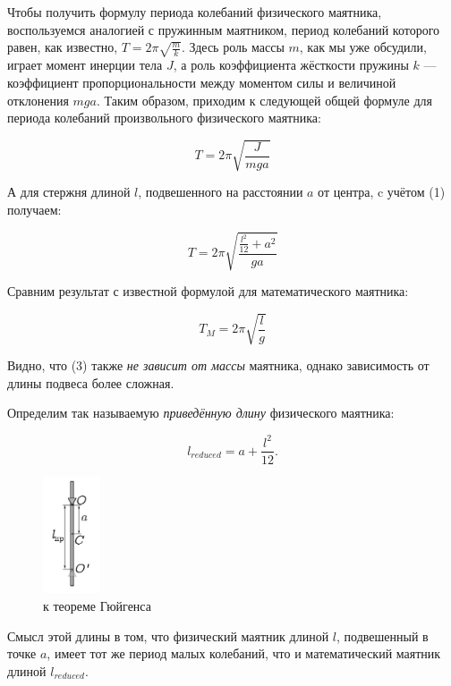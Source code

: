\documentclass[12pt, a4paper]{article}
\begin{document}
Чтобы получить формулу периода колебаний физического маятника,
воспользуемся аналогией с пружинным маятником, период колебаний которого
равен, как известно, $T = 2\pi\sqrt{\frac{m}{k}}$. Здесь роль массы $m$,
как мы уже обсудили, играет момент инерции тела $J$, а роль коэффициента
жёсткости пружины $k$ — коэффициент пропорциональности между моментом силы и
величиной отклонения $mga$. Таким образом, приходим к следующей общей формуле
для периода колебаний произвольного физического маятника:

\begin{equation}
    T = 2\pi\sqrt{\frac{J}{mga}}
\end{equation}

А для стержня длиной $l$, подвешенного на расстоянии $a$ от центра, c учётом
(1) получаем:

\begin{equation}
    T = 2\pi\sqrt{\frac{\frac{l^2}{12} + a^2}{ga}}
\end{equation}

Сравним результат с известной формулой для математического маятника:

\begin{equation}
    T_M = 2\pi\sqrt{\frac{l}{g}}
\end{equation}

Видно, что (3) также \textit{не зависит от массы} маятника, однако зависимость
от длины подвеса более сложная. 

Определим так называемую \textit{приведённую длину} физического маятника:

\begin{equation}
    l_{reduced} = a + \frac{l^2}{12}.
\end{equation}

\newpage

\begin{figure}
    \centering
    \includegraphics[width = 0.15\textwidth]{Figure 2}
    \caption{к теореме Гюйгенса}
\end{figure}

Смысл этой длины в том, что физический маятник длиной $l$, подвешенный
в точке $a$, имеет тот же период малых колебаний, что и математический
маятник длиной $l_{reduced}$.
\end{document}

